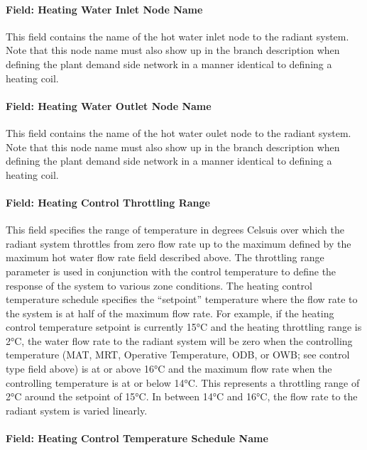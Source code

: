 \paragraph{Field: Heating Water Inlet Node Name}\label{field-heating-water-inlet-node-name}

This field contains the name of the hot water inlet node to the radiant system. Note that this node name must also show up in the branch description when defining the plant demand side network in a manner identical to defining a heating coil.

\paragraph{Field: Heating Water Outlet Node Name}\label{field-heating-water-outlet-node-name}

This field contains the name of the hot water oulet node to the radiant system. Note that this node name must also show up in the branch description when defining the plant demand side network in a manner identical to defining a heating coil.

\paragraph{Field: Heating Control Throttling Range}\label{field-heating-control-throttling-range}

This field specifies the range of temperature in degrees Celsuis over which the radiant system throttles from zero flow rate up to the maximum defined by the maximum hot water flow rate field described above. The throttling range parameter is used in conjunction with the control temperature to define the response of the system to various zone conditions. The heating control temperature schedule specifies the ``setpoint'' temperature where the flow rate to the system is at half of the maximum flow rate. For example, if the heating control temperature setpoint is currently 15°C and the heating throttling range is 2°C, the water flow rate to the radiant system will be zero when the controlling temperature (MAT, MRT, Operative Temperature, ODB, or OWB; see control type field above) is at or above 16°C and the maximum flow rate when the controlling temperature is at or below 14°C. This represents a throttling range of 2°C around the setpoint of 15°C. In between 14°C and 16°C, the flow rate to the radiant system is varied linearly.

\paragraph{Field: Heating Control Temperature Schedule Name}\label{field-heating-control-temperature-schedule-name}

